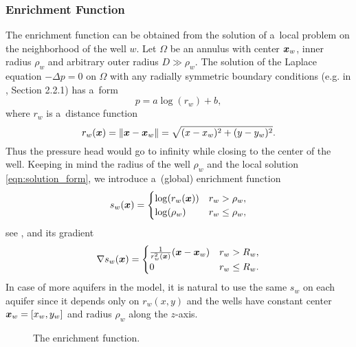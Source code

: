 \subsubsection{Enrichment Function} \label{sec:enrichment_func}
The enrichment function can be obtained from the solution of a~local problem on the neighborhood of the well $w$.
Let $\Omega$ be an annulus with center $\mathbf{\boldsymbol{x}}_w$, inner radius $\rho_w$ and arbitrary outer radius $D \gg \rho_w$.
The solution of the Laplace equation $-\Delta p = 0$ on $\Omega$ with any radially symmetric boundary conditions
(e.g. in \cite{evans_partial_2010}, Section 2.2.1) has a~form
%
\begin{equation} \label{eqn:solution_form}
  p = a \log(r_w)+b, %
\end{equation}
where $r_w$ is a~distance function
\begin{equation} \label{eqn:distance}
r_w(\mathbf{\boldsymbol{x}}) = \|\mathbf{\boldsymbol{x}} - \mathbf{\boldsymbol{x}}_w\|= \sqrt{(x-x_w)^2+(y-y_w)^2}.
\end{equation}
%
Thus the pressure head would go to infinity while closing to the center of the well.
Keeping in mind the radius of the well $\rho_w$ and the local solution \eqref{eqn:solution_form}, 
we introduce a~(global) enrichment function
%
\begin{equation}
\label{eqn:enrich_func}
s_w(\mathbf{\boldsymbol{x}}) = 
  \begin{cases}
  \log(r_w(\mathbf{\boldsymbol{x}})) & r_w > \rho_w,\\
  \log(\rho_w) & r_w \le \rho_w,\\
  \end{cases}
\end{equation}
see , and its gradient
\begin{equation} \label{eqn:enrich_grad}
\nabla s_w(\mathbf{\boldsymbol{x}}) = 
  \begin{cases}  
    \frac{1}{r_w^2(\mathbf{\boldsymbol{x}})}(\mathbf{\boldsymbol{x}} - \mathbf{\boldsymbol{x}}_w) & r_w>R_w, \\
    0 & r_w \leq R_w.
  \end{cases}
\end{equation}
In case of more aquifers in the model, it is natural to use the same $s_w$ on each aquifer 
since it depends only on $r_w(x,y)$ and the wells have constant center $\mathbf{\boldsymbol{x}}_w=[x_w, y_w]$ and radius $\rho_w$ along the $z$-axis.

\begin{figure}[!htb]
  \begin{center}         
    \def\svgwidth{0.5\textwidth}
    
  \end{center}
  \caption{The enrichment function.}
  \label{fig:enrich_func}
\end{figure}


